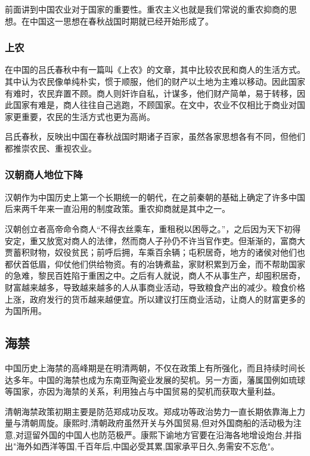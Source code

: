 前面讲到中国农业对于国家的重要性。重农主义也就是我们常说的重农抑商的思想。在中国这一思想在春秋战国时期就已经开始形成了。

\subsubsection{上农}

在中国的吕氏春秋中有一篇叫《上农》的文章，其中比较农民和商人的生活方式。其中认为农民像单纯朴实，惯于顺服，他们的财产以土地为主难以移动。因此国家有难时，农民弃置不顾。商人则奸诈自私，计谋多，他们财产简单，易于转移，因此国家有难是，商人往往自己逃跑，不顾国家。在文中，农业不仅相比于商业对国家更重要，农民的生活方式也更为高尚。

吕氏春秋，反映出中国在春秋战国时期诸子百家，虽然各家思想各有不同，但他们都推崇农民、重视农业。

\subsubsection{汉朝商人地位下降}

汉朝作为中国历史上第一个长期统一的朝代，在之前秦朝的基础上确定了许多中国后来两千年来一直沿用的制度政策。重农抑商就是其中之一。

汉朝创立者高帝命令商人“不得衣丝乘车，重租税以困辱之。”，之后因为天下初得安定，重又放宽对商人的法律，然而商人子孙仍不许当官作吏。但渐渐的，富商大贾蓄积财物，奴役贫民；前呼后拥，车乘百余辆；屯积居奇，地方的诸侯对他们也都伏首低眉，仰仗他们供给物资。有的冶铸煮盐，家财积累到万金，而不帮助国家的急难，黎民百姓陷于重困之中。之后有人就说，商人不从事生产，却囤积居奇，财富越来越多，导致越来越多的人从事商业活动，导致粮食产出的减少。粮食价格上涨，政府发行的货币越来越便宜。所以建议打压商业活动，让商人的财富更多的为国所用。

\subsection{海禁}

中国历史上海禁的高峰期是在明清两朝，不仅在政策上有所强化，而且持续时间长达多年。中国的海禁也成为东南亚陶瓷业发展的契机。另一方面，藩属国例如琉球等国家，亦因为海禁的关系，利用独占与中国贸易的契机而获取大量利益。

清朝海禁政策初期主要是防范郑成功反攻。郑成功等政治势力一直长期依靠海上力量与清朝周旋。康熙时,清朝政府虽然开关与外国贸易,但对外国商船的活动极为注意,对逗留外国的中国人也防范极严。康熙下谕地方官要在沿海各地增设炮台,并指出"海外如西洋等国,千百年后,中国必受其累,国家承平日久,务需安不忘危"。
